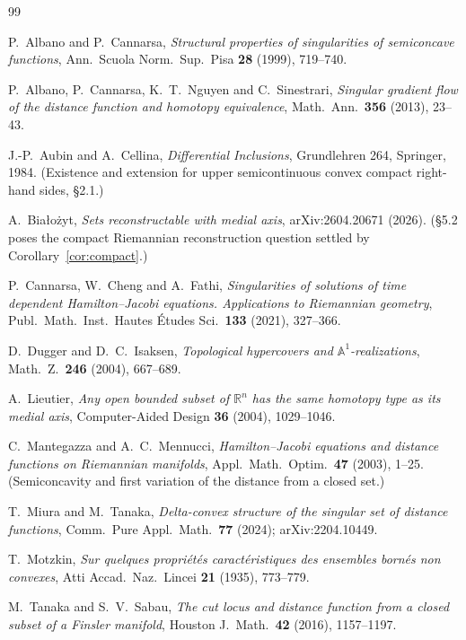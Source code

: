 \documentclass[11pt]{article}
\theoremstyle{remark}
\newcommand{\R}{\mathbb{R}}
\begin{document}
\begin{thebibliography}{99}

 P.~Albano and P.~Cannarsa, \emph{Structural properties
of singularities of semiconcave functions}, Ann.\ Scuola Norm.\ Sup.\
Pisa \textbf{28} (1999), 719--740.

 P.~Albano, P.~Cannarsa, K.~T.~Nguyen and
C.~Sinestrari, \emph{Singular gradient flow of the distance function
and homotopy equivalence}, Math.\ Ann.\ \textbf{356} (2013), 23--43.

 J.-P.~Aubin and A.~Cellina, \emph{Differential
Inclusions}, Grundlehren 264, Springer, 1984. (Existence and extension
for upper semicontinuous convex compact right-hand sides, \S2.1.)

 A.~Bia\l{}o\.zyt, \emph{Sets reconstructable with
medial axis}, arXiv:2604.20671 (2026). (\S5.2 poses the compact
Riemannian reconstruction question settled by
Corollary~\ref{cor:compact}.)

 P.~Cannarsa, W.~Cheng and A.~Fathi, \emph{Singularities
of solutions of time dependent Hamilton--Jacobi equations.
Applications to Riemannian geometry}, Publ.\ Math.\ Inst.\ Hautes
\'Etudes Sci.\ \textbf{133} (2021), 327--366.

 D.~Dugger and D.~C.~Isaksen, \emph{Topological
hypercovers and $\mathbb{A}^{1}$-realizations}, Math.\ Z.\
\textbf{246} (2004), 667--689.

 A.~Lieutier, \emph{Any open bounded subset of $\R^{n}$
has the same homotopy type as its medial axis}, Computer-Aided Design
\textbf{36} (2004), 1029--1046.

 C.~Mantegazza and A.~C.~Mennucci, \emph{Hamilton--Jacobi
equations and distance functions on Riemannian manifolds}, Appl.\
Math.\ Optim.\ \textbf{47} (2003), 1--25. (Semiconcavity and first
variation of the distance from a closed set.)

\bibitem{MT} T.~Miura and M.~Tanaka, \emph{Delta-convex structure
of the singular set of distance functions}, Comm.\ Pure Appl.\
Math.\ \textbf{77} (2024); arXiv:2204.10449.

\bibitem{Mot} T.~Motzkin, \emph{Sur quelques propri\'et\'es
caract\'eristiques des ensembles born\'es non convexes}, Atti Accad.\
Naz.\ Lincei \textbf{21} (1935), 773--779.

 M.~Tanaka and S.~V.~Sabau, \emph{The cut locus and
distance function from a closed subset of a Finsler manifold},
Houston J.\ Math.\ \textbf{42} (2016), 1157--1197.

\end{thebibliography}
\end{document}

